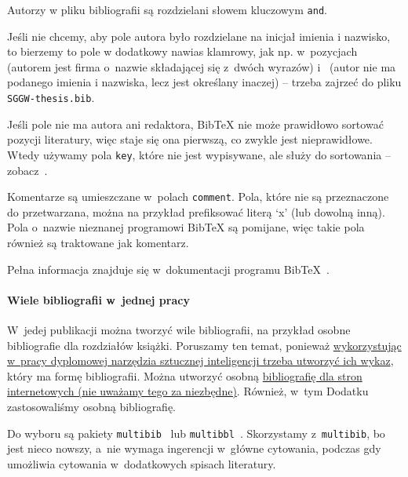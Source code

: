 Autorzy w pliku bibliografii są rozdzielani słowem kluczowym {\tt and}.

Jeśli nie chcemy, aby pole autora było rozdzielane na inicjał imienia i nazwisko, to bierzemy to pole w dodatkowy nawias klamrowy, jak np. w~pozycjach~ (autorem jest firma o~nazwie składającej się z~dwóch wyrazów) i~ (autor nie ma podanego imienia i nazwiska, lecz jest określany inaczej) -- trzeba zajrzeć do pliku {\tt SGGW-thesis.bib}.

Jeśli pole nie ma autora ani redaktora, Bib\TeX{} nie może prawidłowo sortować pozycji literatury, więc staje się ona pierwszą, co zwykle jest nieprawidłowe. Wtedy używamy pola {\tt key}, które nie jest wypisywane, ale służy do sortowania -- zobacz~.

Komentarze są umieszczane w~polach {\tt comment}. Pola, które nie są przeznaczone do przetwarzana, można na przykład prefiksować literą `x' (lub dowolną inną). Pola o~nazwie nieznanej programowi Bib\TeX{} są pomijane, więc takie pola również są traktowane jak komentarz.

Pełna informacja znajduje się w~dokumentacji programu Bib\TeX~.


\paragraph{Wiele bibliografii w~jednej pracy}
\label{sec:dod:bibliografia-wiele}

W~jedej publikacji można tworzyć wile bibliografii, na przykład osobne bibliografie dla rozdziałów książki. Poruszamy ten temat, ponieważ \hyperref[sec:dod:bibliografia-SI]{wykorzystując w~pracy dyplomowej narzędzia sztucznej inteligencji trzeba utworzyć ich wykaz}, który ma formę bibliografii. Można utworzyć osobną \hyperref[sec:dod:bibliografia-url]{bibliografię dla stron internetowych (nie uważamy tego za niezbędne)}. Również, w~tym Dodatku zastosowaliśmy osobną bibliografię.

Do wyboru są pakiety {\tt multibib}~ lub {\tt multibbl}~. Skorzystamy z~{\tt multibib}, bo jest nieco nowszy, a~nie wymaga ingerencji w~główne cytowania, podczas gdy umożliwia cytowania w~dodatkowych spisach literatury.

